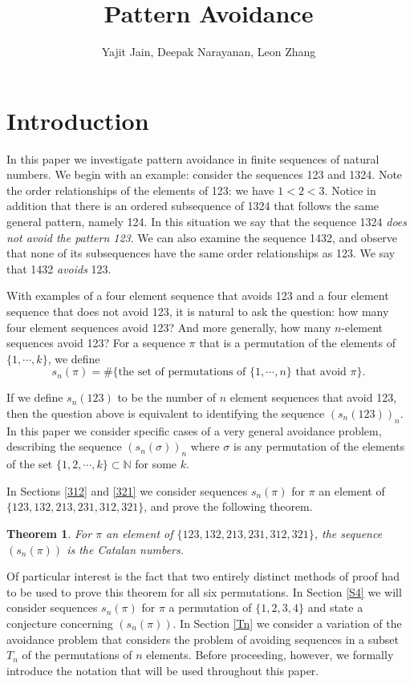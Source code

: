 \documentclass[11pt,letterpaper,twoside,english]{article}
\title{Pattern Avoidance}
\author{Yajit Jain, Deepak Narayanan, Leon Zhang}
\theoremstyle{theorem}
\newtheorem*{theorem*}{Theorem}
\theoremstyle{remark}
\begin{document}
\maketitle

\section{Introduction}
In this paper we investigate pattern avoidance in finite sequences of natural numbers. We begin with an example: consider the sequences 123 and 1324. Note the order relationships of the elements of 123: we have $1< 2 < 3$. Notice in addition that there is an ordered subsequence of 1324 that follows the same general pattern, namely 124. In this situation we say that the sequence 1324 \emph{does not avoid the pattern 123}. We can also examine the sequence 1432, and observe that none of its subsequences have the same order relationships as 123. We say that 1432 \emph{avoids} 123.

With examples of a four element sequence that avoids 123 and a four element sequence that does not avoid 123, it is natural to ask the question: how many four element sequences avoid 123? And more generally, how many $n$-element sequences avoid 123? For a sequence $\pi$ that is a permutation of the elements of $\{1,\cdots,k\}$, we define
$$
s_n(\pi)=\#\{\text{the set of permutations of $\{1,\cdots, n\}$ that avoid $\pi$}\}.
$$


If we define $s_n(123)$ to be the number of $n$ element sequences that avoid 123, then the question above is equivalent to identifying the sequence $(s_n(123))_n$. In this paper we consider specific cases of a very general avoidance problem, describing the sequence $(s_n(\sigma))_n$ where $\sigma$ is any permutation of the elements of the set $\{1,2,\cdots, k\}\subset\mathbb{N}$ for some $k$.

In Sections \ref{312} and \ref{321} we consider sequences $s_n(\pi)$ for $\pi$ an element of  \\ $\{123,132,213,231,312,321\}$, and prove the following theorem.

\begin{theorem*}
For $\pi$ an element of $\{123,132,213,231,312,321\}$, the sequence $(s_n(\pi))$ is the Catalan numbers.
\end{theorem*}

Of particular interest is the fact that two entirely distinct methods of proof had to be used to prove this theorem for all six permutations. In Section \ref{S4} we will consider sequences $s_n(\pi)$ for $\pi$ a permutation of $\{1,2,3,4\}$ and state a conjecture concerning $(s_n(\pi))$. In Section \ref{Tn} we consider a variation of the avoidance problem that considers the problem of avoiding sequences in a subset $T_n$ of the permutations of $n$ elements. Before proceeding, however, we formally introduce the notation that will be used throughout this paper.  
\end{document}
